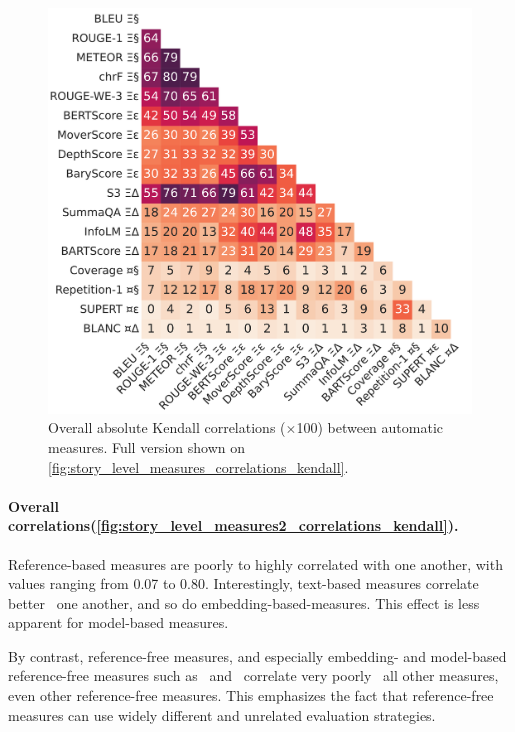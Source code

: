 \begin{figure}[!h]
\centering
    \centering
    \includegraphics[width=\columnwidth]{pictures/metrics_filtered_story_kendall.pdf}
    \caption{Overall absolute Kendall correlations ($\times$100) between automatic measures. Full version shown on \autoref{fig:story_level_measures_correlations_kendall}.}
    \label{fig:story_level_measures2_correlations_kendall}
\end{figure}

\paragraph{Overall correlations(\autoref{fig:story_level_measures2_correlations_kendall}).}
Reference-based measures are poorly to highly correlated with one another, with values ranging from 0.07 to 0.80. Interestingly, text-based measures correlate better \wrt\ one another, and so do embedding-based-measures. This effect is less apparent for model-based  measures.

By contrast, reference-free measures, and especially embedding- and model-based reference-free measures such as \supert\ and \blanc\, correlate very poorly \wrt\ all other measures, even other reference-free measures. This emphasizes the fact that reference-free measures can use widely different and unrelated evaluation strategies.

